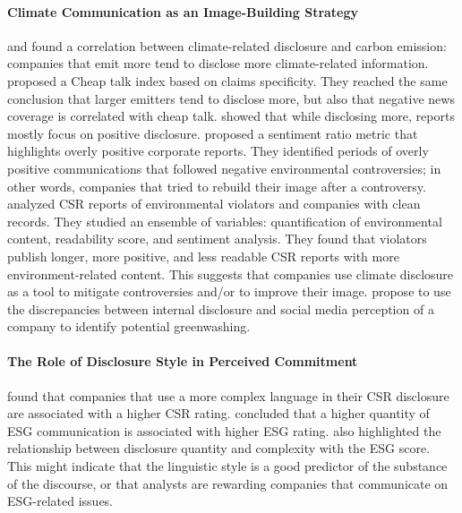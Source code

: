 \paragraph{Climate Communication as an Image-Building Strategy} \citet{dingCarbonEmissionsTCFD2023} and \citet{chou_ESG} found a correlation between climate-related disclosure and carbon emission: companies that emit more tend to disclose more climate-related information. \citet{bingler2023cheaptalkspecificitysentiment} proposed a Cheap talk index based on claims specificity. They reached the same conclusion that larger emitters tend to disclose more, but also that negative news coverage is correlated with cheap talk. \citet{marco_polignano_nlp_2022} showed that while disclosing more, reports mostly focus on positive disclosure.  \citet{hyewon_kang_analyzing_2022} proposed a sentiment ratio metric that highlights overly positive corporate reports. They identified periods of overly positive communications that followed negative environmental controversies; in other words, companies that tried to rebuild their image after a controversy. 
\citet{csr_report_greenwashing} analyzed CSR reports of environmental violators and companies with clean records. They studied an ensemble of variables: quantification of environmental content, readability score, and sentiment analysis. They found that violators publish longer, more positive, and less readable CSR reports with more environment-related content.
This suggests that companies use climate disclosure as a tool to mitigate controversies and/or to improve their image. \citet{kdir23} propose to use the discrepancies between internal disclosure and social media perception of a company to identify potential greenwashing.

\paragraph{The Role of Disclosure Style in Perceived Commitment} \citet{clarkson_nlp_us_csr} found that companies that use a more complex language in their CSR disclosure are associated with a higher CSR rating. \citet{schimanski_bridging_2023} concluded that a higher quantity of ESG communication is associated with higher ESG rating. \citet{rouenEvolutionESGReports2023} also highlighted the relationship between disclosure quantity and complexity with the ESG score. This might indicate that the linguistic style is a good predictor of the substance of the discourse, or that analysts are rewarding companies that communicate on ESG-related issues.

